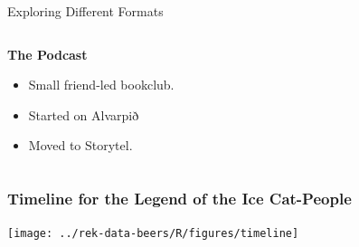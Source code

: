 \begin{frame}{Exploring Different Formats}
\begin{columns}[T]
\begin{column}{0.32\textwidth}
      \textbf{The Podcast}
      \begin{itemize}
        \item Small friend-led bookclub.
        \item Started on Alvarpið
        \item Moved to Storytel.
      \end{itemize}
    \end{column}
  \end{columns}
\end{frame}


\begin{frame}
    \frametitle{Timeline for the Legend of the Ice Cat-People}
    \texttt{[image: ../rek-data-beers/R/figures/timeline]}
\end{frame}
